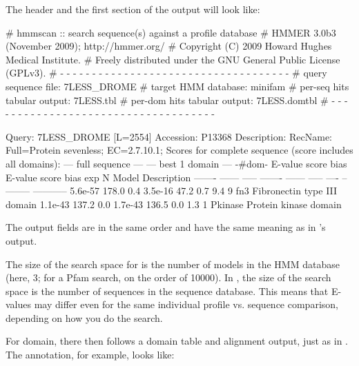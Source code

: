 
The header and the first section of the output will look like:

\begin{sreoutput}
# hmmscan :: search sequence(s) against a profile database
# HMMER 3.0b3 (November 2009); http://hmmer.org/
# Copyright (C) 2009 Howard Hughes Medical Institute.
# Freely distributed under the GNU General Public License (GPLv3).
# - - - - - - - - - - - - - - - - - - - - - - - - - - - - - - - - - - - -
# query sequence file:             7LESS_DROME
# target HMM database:             minifam
# per-seq hits tabular output:     7LESS.tbl
# per-dom hits tabular output:     7LESS.domtbl
# - - - - - - - - - - - - - - - - - - - - - - - - - - - - - - - - - - - -

Query:       7LESS_DROME  [L=2554]
Accession:   P13368
Description: RecName: Full=Protein sevenless;          EC=2.7.10.1;
Scores for complete sequence (score includes all domains):
   --- full sequence ---   --- best 1 domain ---    -#dom-
    E-value  score  bias    E-value  score  bias    exp  N  Model    Description
    ------- ------ -----    ------- ------ -----   ---- --  -------- -----------
    5.6e-57  178.0   0.4    3.5e-16   47.2   0.7    9.4  9  fn3      Fibronectin type III domain
    1.1e-43  137.2   0.0    1.7e-43  136.5   0.0    1.3  1  Pkinase  Protein kinase domain
\end{sreoutput}

The output fields are in the same order and have the same meaning as
in 's output. 

The size of the search space for  is the number of
models in the HMM database (here, 3; for a Pfam search, on the order
of 10000). In , the size of the search space is the
number of sequences in the sequence database. This means that E-values
may differ even for the same individual profile vs. sequence
comparison, depending on how you do the search.

For domain, there then follows a domain table and alignment output,
just as in . The  annotation, for example,
looks like:

